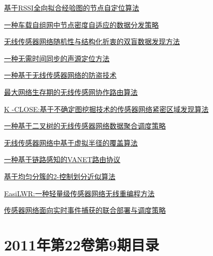 \documentclass[a4paper]{article}
\begin{document}
\href{http://www.jos.org.cn/ch/reader/download_pdf.aspx?file_no=11008&year_id=2011&quarter_id=zk1&falg=1}{基于RSSI全向拟合经验图的节点自定位算法}

\href{http://www.jos.org.cn/ch/reader/download_pdf.aspx?file_no=11009&year_id=2011&quarter_id=zk1&falg=1}{一种车载自组网中节点密度自适应的数据分发策略}

\href{http://www.jos.org.cn/ch/reader/download_pdf.aspx?file_no=11010&year_id=2011&quarter_id=zk1&falg=1}{无线传感器网络随机性与结构化折衷的双盲数据发现方法}

\href{http://www.jos.org.cn/ch/reader/download_pdf.aspx?file_no=11011&year_id=2011&quarter_id=zk1&falg=1}{一种无需时间同步的声源定位方法}

\href{http://www.jos.org.cn/ch/reader/download_pdf.aspx?file_no=11012&year_id=2011&quarter_id=zk1&falg=1}{一种基于无线传感器网络的防盗技术}

\href{http://www.jos.org.cn/ch/reader/download_pdf.aspx?file_no=11013&year_id=2011&quarter_id=zk1&falg=1}{最大网络生存期的无线传感网协作路由算法}

\href{http://www.jos.org.cn/ch/reader/download_pdf.aspx?file_no=11014&year_id=2011&quarter_id=zk1&falg=1}{K -CLOSE:基于不确定图挖掘技术的传感器网络紧密区域发现算法}

\href{http://www.jos.org.cn/ch/reader/download_pdf.aspx?file_no=11015&year_id=2011&quarter_id=zk1&falg=1}{一种基于二叉树的无线传感器网络数据聚合调度策略}

\href{http://www.jos.org.cn/ch/reader/download_pdf.aspx?file_no=11016&year_id=2011&quarter_id=zk1&falg=1}{无线传感器网络中基于虚拟半径的覆盖算法}

\href{http://www.jos.org.cn/ch/reader/download_pdf.aspx?file_no=11017&year_id=2011&quarter_id=zk1&falg=1}{一种基于链路感知的VANET路由协议}

\href{http://www.jos.org.cn/ch/reader/download_pdf.aspx?file_no=11018&year_id=2011&quarter_id=zk1&falg=1}{基于均匀分簇的2-控制划分近似算法}

\href{http://www.jos.org.cn/ch/reader/download_pdf.aspx?file_no=11019&year_id=2011&quarter_id=zk1&falg=1}{EasiLWR:一种轻量级传感器网络无线重编程方法}

\href{http://www.jos.org.cn/ch/reader/download_pdf.aspx?file_no=11020&year_id=2011&quarter_id=zk1&falg=1}{传感器网络面向实时事件捕获的联合部署与调度策略}


\section{\textbf{2011年第22卷第9期目录}}
\end{document}
